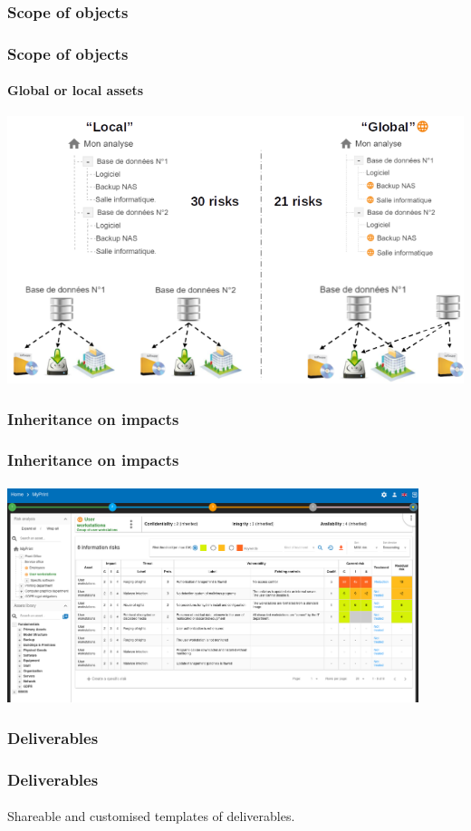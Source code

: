 \subsubsection{Scope of objects}
\begin{frame}
  \frametitle{Scope of objects}
  \framesubtitle{Global or local assets}
  \begin{center}
    \begin{center}
      \includegraphics[scale=0.45]{../common_pictures/global-vs-local.png}
    \end{center}
  \end{center}
\end{frame}

\subsubsection{Inheritance on impacts}
\begin{frame}
  \frametitle{Inheritance on impacts}
  \framesubtitle{}
  \begin{center}
    \begin{center}
      \includegraphics[width=12cm]{./pictures/impacts-inheritance.png}
    \end{center}
  \end{center}
\end{frame}

\subsubsection{Deliverables}
\begin{frame}
  \frametitle{Deliverables}
  \framesubtitle{}
  Shareable and customised templates of deliverables.
\end{frame}
